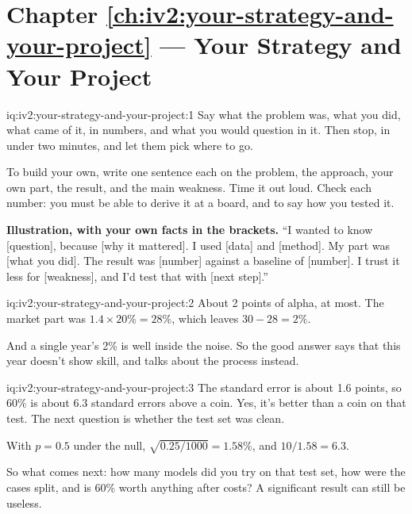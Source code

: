 \section*{Chapter \ref{ch:iv2:your-strategy-and-your-project} --- Your Strategy and Your Project}

\begin{solution}{iq:iv2:your-strategy-and-your-project:1}
Say what the problem was, what you did, what came of it, in numbers, and what you would question in it. Then stop, in under two minutes, and let them pick where to go.

To build your own, write one sentence each on the problem, the approach, your own part, the result, and the main weakness. Time it out loud. Check each number: you must be able to derive it at a board, and to say how you tested it.

\textbf{Illustration, with your own facts in the brackets.} ``I wanted to know [question], because [why it mattered]. I used [data] and [method]. My part was [what you did]. The result was [number] against a baseline of [number]. I trust it less for [weakness], and I'd test that with [next step].''

\end{solution}

\begin{solution}{iq:iv2:your-strategy-and-your-project:2}
About 2 points of alpha, at most. The market part was $1.4 \times 20\% = 28\%$, which leaves $30 - 28 = 2\%$.

And a single year's 2\% is well inside the noise. So the good answer says that this year doesn't show skill, and talks about the process instead.

\end{solution}

\begin{solution}{iq:iv2:your-strategy-and-your-project:3}
The standard error is about 1.6 points, so 60\% is about 6.3 standard errors above a coin. Yes, it's better than a coin on that test. The next question is whether the test set was clean.

With $p = 0.5$ under the null, $\sqrt{0.25/1000} = 1.58\%$, and $10/1.58 = 6.3$.

So what comes next: how many models did you try on that test set, how were the cases split, and is 60\% worth anything after costs? A significant result can still be useless.

\end{solution}

